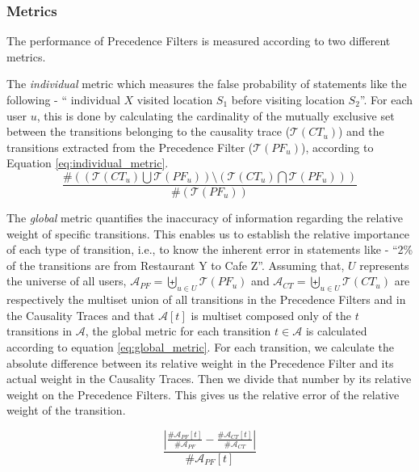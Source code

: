 \subsubsection{Metrics}

The performance of Precedence Filters is measured according to two
different metrics.

The \emph{individual} metric which measures the
false probability of statements like the following - ``
individual $X$ visited location $S_1$ before visiting location
$S_2$''. For each user $u$, this is done by calculating the cardinality of the mutually
exclusive set between the transitions belonging to the causality trace
($\mathcal{T}(CT_u)$) and the transitions extracted from the Precedence Filter
($\mathcal{T}(PF_u)$), according to Equation \ref{eq:individual_metric}.
 \begin{equation}
   \label{eq:individual_metric}
   \frac{\# ( (\mathcal{T}(CT_u) \bigcup \mathcal{T}(PF_u) )
       \setminus (\mathcal{T}(CT_u) \bigcap \mathcal{T}(PF_u) ) )}
     {\#(\mathcal{T}(PF_u))}
 \end{equation}

 The \emph{global} metric quantifies the inaccuracy of information
 regarding the relative weight of specific transitions. This enables
 us to establish the relative importance of each type of transition,
 i.e., to know the inherent error in statements like - ``2\% of the
 transitions are from Restaurant Y to Cafe Z''.  Assuming that, $U$
 represents the universe of all users, $\mathcal{A}_{PF} = \biguplus_{u \in
 U} \mathcal{T}(PF_u)$ and $\mathcal{A}_{CT} = \biguplus_{u \in
 U} \mathcal{T}(CT_u)$ are respectively the multiset union of all transitions
in the Precedence Filters and in the Causality Traces and that
$\mathcal{A}[t]$ is multiset composed only of the $t$ transitions in
$\mathcal{A}$, the global metric for each transition $t \in
\mathcal{A}$ is calculated according to equation
\ref{eq:global_metric}. For each transition, we calculate the
absolute difference between its relative weight in the Precedence Filter and
its actual weight in the Causality Traces. Then we divide that number
by its relative weight on the Precedence Filters. This gives us the
relative error of the relative weight of the transition.

\begin{equation}
  \label{eq:global_metric}
   \frac {\left| \frac{ \# \mathcal{A}_{PF}[t]}{\#\mathcal{A}_{PF}} -
    \frac{\#\mathcal{A}_{CT}[t]} {\# \mathcal{A}_{CT} }\right|}
{\#\mathcal{A}_{PF}[t]}
 \end{equation}

